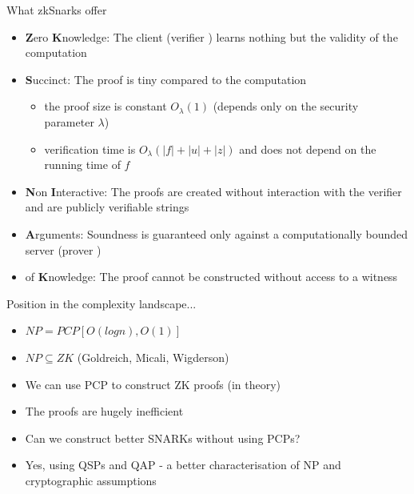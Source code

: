 \documentclass[handout]{beamer}
\begin{document}
\begin{frame}{What zkSnarks offer}
\begin{itemize}
    \item \textbf{Z}ero \textbf{K}nowledge: The client (verifier \ver) learns nothing but the validity of the computation
    \item \textbf{S}uccinct: The proof is tiny compared to the computation 
    \begin{itemize}
        \item the proof size is constant $O_{\lambda}(1)$ (depends only on the security parameter $\lambda$)
        \item verification time is $O_{\lambda}(|f| + |u| + |z|)$ and does not depend on the running time of $f$
    \end{itemize}
    \item \textbf{N}on \textbf{I}nteractive: The proofs are created without interaction with the verifier and are publicly verifiable strings
    \item \textbf{A}rguments: Soundness is guaranteed only against a computationally bounded server (prover \prv)
    \item of \textbf{K}nowledge: The proof cannot be constructed without access to a witness
\end{itemize}
\end{frame}

\begin{frame}{Position in the complexity landscape...}
    \begin{itemize}
        \item $NP = PCP[O(logn),O(1)]$
        \item $NP \subseteq ZK$ (Goldreich, Micali, Wigderson)
        \item We can use PCP to construct ZK proofs (in theory)
        \item The proofs are hugely inefficient
        \item Can we construct better SNARKs without using PCPs?
        \item Yes, using QSPs and QAP - a better characterisation of NP and cryptographic assumptions
    \end{itemize}
\end{frame}
\end{document}
